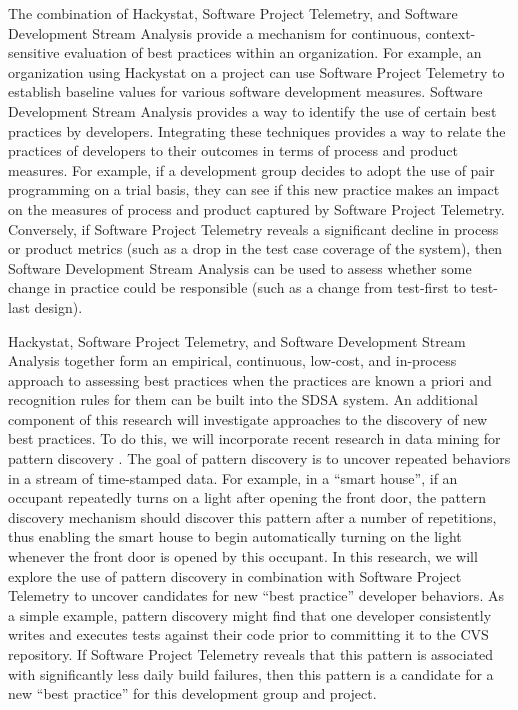 The combination of Hackystat, Software Project Telemetry, and Software
Development Stream Analysis provide a mechanism for continuous,
context-sensitive evaluation of best practices within an organization.  For
example, an organization using Hackystat on a project can use Software
Project Telemetry to establish baseline values for various software
development measures.  Software Development Stream Analysis provides a way
to identify the use of certain best practices by developers.  Integrating
these techniques provides a way to relate the practices of
developers to their outcomes in terms of process and product measures. 
For example, if a development group decides to adopt the use of pair
programming on a trial basis, they can see if this new practice makes an
impact on the measures of process and product captured by Software Project
Telemetry.  Conversely, if Software Project Telemetry reveals a significant
decline in process or product metrics (such as a drop in the test case
coverage of the system), then Software Development Stream Analysis can be
used to assess whether some change in practice could be responsible (such
as a change from test-first to test-last design).

Hackystat, Software Project Telemetry, and Software Development Stream
Analysis together form an empirical, continuous, low-cost, and in-process
approach to assessing best practices when the practices are known a priori
and recognition rules for them can be built into the SDSA system.  An
additional component of this research will investigate approaches to the
discovery of new best practices.  To do this, we will incorporate recent
research in data mining for pattern discovery
\cite{Heierman04,Mannila95,Agrawal95}.  The goal of pattern discovery is to
uncover repeated behaviors in a stream of time-stamped data.  For example,
in a ``smart house'', if an occupant repeatedly turns on a light after
opening the front door, the pattern discovery mechanism should discover
this pattern after a number of repetitions, thus enabling the smart house
to begin automatically turning on the light whenever the front door is
opened by this occupant.  In this research, we will explore the use of
pattern discovery in combination with Software Project Telemetry to uncover
candidates for new ``best practice'' developer behaviors.  As a simple
example, pattern discovery might find that one developer consistently
writes and executes tests against their code prior to committing it to the
CVS repository. If Software Project Telemetry reveals that this pattern is
associated with significantly less daily build failures, then this pattern
is a candidate for a new ``best practice'' for this development group and
project.


